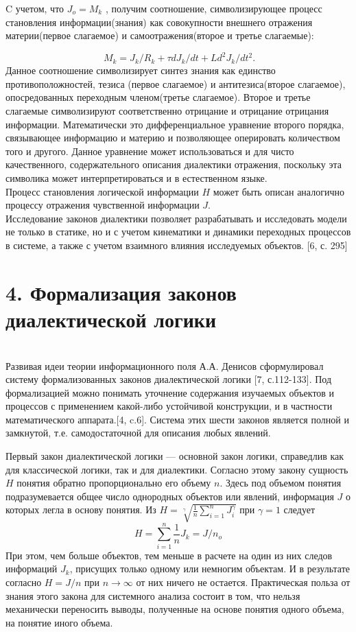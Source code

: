 \documentclass[a4paper,12pt]{report}
\begin{document}
C учетом, что $J_o = M_k$ , получим соотношение, символизирующее процесс становления информации(знания) как совокупности внешнего отражения материи(первое слагаемое) и самоотражения(второе и третье слагаемые):

\begin{equation}
\label{trivial}
 \ M_k = J_k/R_k + \tau dJ_k/dt + Ld^2J_k/dt^2.
\end{equation} 
 Данное соотношение символизирует синтез знания как единство противоположностей, тезиса (первое слагаемое) и антитезиса(второе слагаемое), опосредованных переходным членом(третье слагаемое). Второе и третье слагаемые символизируют соответственно отрицание и отрицание отрицания информации. Математически это дифференциальное уравнение второго порядка, связывающее информацию и материю и позволяющее оперировать количеством того и другого. Данное уравнение может использоваться и для чисто качественного, содержательного описания диалектики отражения, поскольку эта символика может интерпретироваться и в естественном языке.\\
 Процесс становления логической информации $H$ может быть описан аналогично процессу отражения чувственной информации $J$. \\
 Исследование законов диалектики позволяет разрабатывать и исследовать модели не только в статике, но и с учетом кинематики и динамики переходных процессов в системе, а также с учетом взаимного влияния исследуемых объектов. [6, с. 295]
 
 \chapter*{4. Формализация законов диалектической логики}
  \\
 
	Развивая идеи теории информационного поля А.А. Денисов сформулировал систему формализованных законов диалектической логики [7, с.112-133]. Под формализацией можно понимать уточнение содержания изучаемых объектов и процессов с применением какой-либо устойчивой конструкции, и в частности математического аппарата.[4, c.6]. Система этих шести законов является полной и замкнутой, т.е. самодостаточной для описания любых явлений.

     Первый закон диалектической логики — основной закон логики, справедлив как для классической логики, так и для диалектики. Согласно этому закону сущность $H$ понятия обратно пропорционально его объему $n$. Здесь под объемом понятия подразумевается общее число однородных объектов или явлений, информация $J$ о которых легла в основу понятия. Из $H = \sqrt[ \gamma ]{ \frac{1}{n} \sum_{i = 1}^n J_i^\gamma} $ при $\gamma = 1$ следует
     $$H = \sum_{i = 1}^n { \frac{1}{n}  J_k = J/n_o} $$
     При этом, чем больше объектов, тем меньше в расчете на один из них следов информаций $J_k$, присущих только одному или немногим объектам. И в результате согласно $H=J/n$ при $n\to\infty$ от них ничего не остается.
Практическая польза от знания этого закона для системного анализа состоит в том, что нельзя механически переносить выводы, полученные на основе понятия одного объема, на понятие иного объема.
\end{document}
